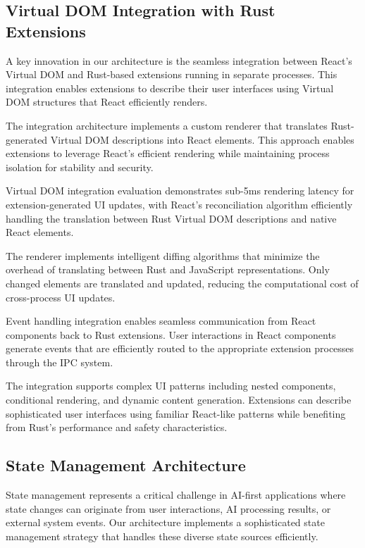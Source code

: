 \subsection*{Virtual DOM Integration with Rust Extensions}

A key innovation in our architecture is the seamless integration between React's Virtual DOM and Rust-based extensions running in separate processes. This integration enables extensions to describe their user interfaces using Virtual DOM structures that React efficiently renders.

The integration architecture implements a custom renderer that translates Rust-generated Virtual DOM descriptions into React elements. This approach enables extensions to leverage React's efficient rendering while maintaining process isolation for stability and security.

\begin{alertbox}
Virtual DOM integration evaluation demonstrates sub-5ms rendering latency for extension-generated UI updates, with React's reconciliation algorithm efficiently handling the translation between Rust Virtual DOM descriptions and native React elements.
\end{alertbox}

The renderer implements intelligent diffing algorithms that minimize the overhead of translating between Rust and JavaScript representations. Only changed elements are translated and updated, reducing the computational cost of cross-process UI updates.

Event handling integration enables seamless communication from React components back to Rust extensions. User interactions in React components generate events that are efficiently routed to the appropriate extension processes through the IPC system.

The integration supports complex UI patterns including nested components, conditional rendering, and dynamic content generation. Extensions can describe sophisticated user interfaces using familiar React-like patterns while benefiting from Rust's performance and safety characteristics.

\subsection*{State Management Architecture}

State management represents a critical challenge in AI-first applications where state changes can originate from user interactions, AI processing results, or external system events. Our architecture implements a sophisticated state management strategy that handles these diverse state sources efficiently.

